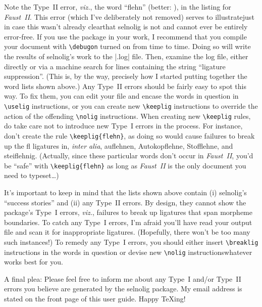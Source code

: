 \documentclass[11pt]{article}
\newcommand{\pkg}[1]{\textsf{#1}}
\newcommand{\cmmd}[1]{\texttt{\textbackslash #1}}
\begin{document}
Note the Type~II error, \emph{viz.}, the word \enquote{flehn} (better: ), in the listing for \emph{Faust~II}. This error (which I've deliberately not removed) serves to illustrate\textemdash just in case this wasn't already clear\textemdash that \pkg{selnolig} is not and cannot ever be entirely error-free. If you use the package in your work, I recommend that you compile your document with \cmmd{debugon} turned on from time to time. Doing so will write the results of \pkg{selnolig}'s work to the |.log| file. Then, examine the log file, either directly or via a machine search for lines containing the string \enquote{ligature suppression}. (This is, by the way, precisely how I started putting together the word lists shown above.) Any Type~II errors should be fairly easy to spot this way. To fix them, you can edit your file and encase the words in question in \cmmd{uselig} instructions, or you can create new \cmmd{keeplig} instructions to override the action of the offending \cmmd{nolig} instructions. When creating new \cmmd{keeplig} rules, do take care not to introduce new Type~I errors in the process. For instance, don't create the rule \Verb+\keeplig{flehn}+, as doing so would cause failures to break up the fl ligatures in, \emph{inter alia}, auflehnen, Auto\-kopflehne, Stofflehne, and steiflehnig. (Actually, since these particular words don't occur in \emph{Faust~II}, you'd be \enquote{safe} with \Verb+\keeplig{flehn}+ as long as \emph{Faust~II} is the only document you need to typeset\dots)

It's important to keep in mind that the lists shown above contain (i) \pkg{selnolig}'s \enquote{success stories} and (ii) any Type~II errors. By design, they cannot show the package's Type~I errors, \emph{viz.}, failures to break up ligatures that span morpheme boundaries. To catch any Type~I errors, I'm afraid you'll have read your output file and scan it for inappropriate ligatures. (Hopefully, there won't be too many such instances!) To remedy any Type~I errors, you should either insert \cmmd{breaklig} instructions in the words in question or devise new \cmmd{nolig} instructions\textemdash whatever works best for you. 

A final plea: Please feel free to inform me about any Type~I and/or Type~II errors you believe are generated by the \pkg{selnolig} package. My email address is stated on the front page of this user guide. Happy \TeX ing!
\end{document}
